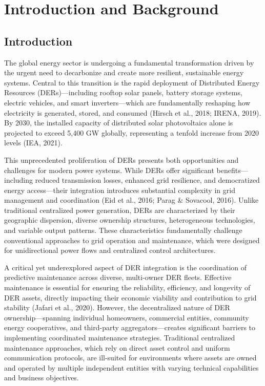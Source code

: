 \section{Introduction and Background}
\label{sec:background}

\subsection{Introduction}

The global energy sector is undergoing a fundamental transformation driven by the urgent need to decarbonize and create more resilient, sustainable energy systems. Central to this transition is the rapid deployment of Distributed Energy Resources (DERs)—including rooftop solar panels, battery storage systems, electric vehicles, and smart inverters—which are fundamentally reshaping how electricity is generated, stored, and consumed (Hirsch et al., 2018; IRENA, 2019). By 2030, the installed capacity of distributed solar photovoltaics alone is projected to exceed 5,400 GW globally, representing a tenfold increase from 2020 levels (IEA, 2021).

This unprecedented proliferation of DERs presents both opportunities and challenges for modern power systems. While DERs offer significant benefits—including reduced transmission losses, enhanced grid resilience, and democratized energy access—their integration introduces substantial complexity in grid management and coordination (Eid et al., 2016; Parag \& Sovacool, 2016). Unlike traditional centralized power generation, DERs are characterized by their geographic dispersion, diverse ownership structures, heterogeneous technologies, and variable output patterns. These characteristics fundamentally challenge conventional approaches to grid operation and maintenance, which were designed for unidirectional power flows and centralized control architectures.

A critical yet underexplored aspect of DER integration is the coordination of predictive maintenance across diverse, multi-owner DER fleets. Effective maintenance is essential for ensuring the reliability, efficiency, and longevity of DER assets, directly impacting their economic viability and contribution to grid stability (Jafari et al., 2020). However, the decentralized nature of DER ownership—spanning individual homeowners, commercial entities, community energy cooperatives, and third-party aggregators—creates significant barriers to implementing coordinated maintenance strategies. Traditional centralized maintenance approaches, which rely on direct asset control and uniform communication protocols, are ill-suited for environments where assets are owned and operated by multiple independent entities with varying technical capabilities and business objectives.

